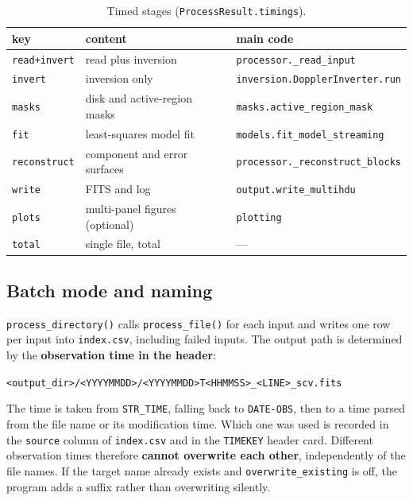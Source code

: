 \documentclass[11pt,a4paper]{article}
\newcommand{\code}[1]{\texttt{\small #1}}
\begin{document}
\begin{table}[htbp]
\centering
\small
\caption{Timed stages (\code{ProcessResult.timings}).}
\label{tab:stages}
\begin{tabular}{lll}
\toprule
key & content & main code \\
\midrule
\code{read+invert}  & read plus inversion & \code{processor.\_read\_input} \\
\code{invert}       & inversion only & \code{inversion.DopplerInverter.run} \\
\code{masks}        & disk and active-region masks & \code{masks.active\_region\_mask} \\
\code{fit}          & least-squares model fit & \code{models.fit\_model\_streaming} \\
\code{reconstruct}  & component and error surfaces & \code{processor.\_reconstruct\_blocks} \\
\code{write}        & FITS and log & \code{output.write\_multihdu} \\
\code{plots}        & multi-panel figures (optional) & \code{plotting} \\
\code{total}        & single file, total & --- \\
\bottomrule
\end{tabular}
\end{table}

\subsection{Batch mode and naming}
\code{process\_directory()} calls \code{process\_file()} for each input and
writes one row per input into \code{index.csv}, including failed inputs.  The
output path is determined by the \textbf{observation time in the header}:
\begin{center}
\code{<output\_dir>/<YYYYMMDD>/<YYYYMMDD>T<HHMMSS>\_<LINE>\_scv.fits}
\end{center}
The time is taken from \code{STR\_TIME}, falling back to \code{DATE-OBS}, then
to a time parsed from the file name or its modification time.  Which one was
used is recorded in the \code{source} column of \code{index.csv} and in the
\code{TIMEKEY} header card.  Different observation times therefore
\textbf{cannot overwrite each other}, independently of the file names.  If the
target name already exists and \code{overwrite\_existing} is off, the program
adds a suffix rather than overwriting silently.

\end{document}
